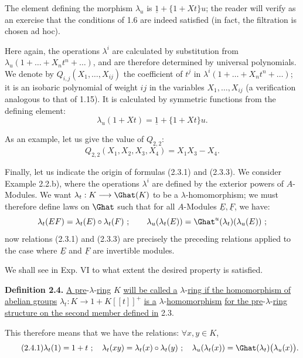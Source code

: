 The element defining the morphism \(\lambda_u\) is \(\underline{1}+\{1+Xt\}u\); the reader will verify as an exercise that the conditions of 1.6 are indeed satisfied (in fact, the filtration is chosen ad hoc).

Here again, the operations \(\lambda^i\) are calculated by substitution from \(\lambda_u(1+\ldots+X_nt^n+\ldots)\), and are therefore determined by universal polynomials. We denote by \(Q_{i,j}(X_1,\ldots,X_{ij})\) the coefficient of \(t^j\) in \(\lambda^i(1+\ldots+X_nt^n+\ldots)\); it is an isobaric polynomial of weight \(ij\) in the variables \(X_1,\ldots,X_{ij}\) (a verification analogous to that of 1.15). It is calculated by symmetric functions from the defining element:
\begin{equation}\tag{2.3.3}
  \lambda_u(1+Xt)=\underline{1}+\{1+Xt\}u.
\end{equation}

As an example, let us give the value of \(Q_{2,2}\):
%
\[
  Q_{2,2}(X_1,X_2,X_3,X_4)=X_1X_3-X_4.
\]

Finally, let us indicate the origin of formulas (2.3.1) and (2.3.3). We consider Example 2.2.b), where the operations \(\lambda^i\) are defined by the exterior powers of \(A\)-Modules. We want \(\lambda_t:K\longrightarrow\Ghat(K)\) to be a \(\lambda\)-homomorphism; we must therefore define laws on \(\Ghat\) such that for all \(A\)-Modules \(\underline{E},\underline{F}\), we have:
\[
  \lambda_t(EF)=\lambda_t(E)\circ\lambda_t(F)~;\qquad
  \lambda_u(\lambda_t(E))=\Ghat^u(\lambda_t)(\lambda_u(E))~;
\]
now relations (2.3.1) and (2.3.3) are precisely the preceding relations applied to the case where \(\underline{E}\) and \(\underline{F}\) are invertible modules.

We shall see in Exp. VI to what extent the desired property is satisfied.

\textbf{Definition 2.4.} \uline{A pre}-\(\lambda\)-\uline{ring} \(K\) \uline{will be called a} \(\lambda\)-\uline{ring if the homomorphism of abelian groups} \(\lambda_t:K\longrightarrow1+K[[t]]^+\) \uline{is a} \(\lambda\)-\uline{homomorphism} \uline{for the pre}-\(\lambda\)-\uline{ring structure on the second member defined in} 2.3.

This therefore means that we have the relations: \(\forall x,y\in K\),
\begin{equation}\tag{2.4.1}
  \lambda_t(1)=1+t~;\quad
  \lambda_t(xy)=\lambda_t(x)\circ\lambda_t(y)~;\quad
  \lambda_u(\lambda_t(x))=\Ghat(\lambda_t)\bigl(\lambda_u(x)\bigr).
\end{equation}

